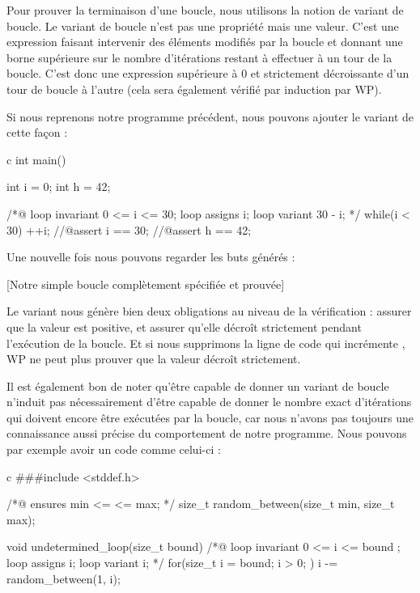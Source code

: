 \documentclass[middle]{zmdocument}
\begin{document}
Pour prouver la terminaison d'une boucle, nous utilisons la notion de variant de 
boucle. Le variant de boucle n'est pas une propriété mais une valeur. C'est une 
expression faisant intervenir des éléments modifiés par la boucle et donnant une
borne supérieure sur le nombre d'itérations restant à effectuer à un tour de la
boucle. C'est donc une expression supérieure à 0 et strictement décroissante d'un 
tour de boucle à l'autre (cela sera également vérifié par induction par WP).



Si nous reprenons notre programme précédent, nous pouvons ajouter le variant
de cette façon :



\begin{CodeBlock}{c}
int main(){
  int i = 0;
  int h = 42;
  
  /*@
    loop invariant 0 <= i <= 30;
    loop assigns i;
    loop variant 30 - i;
  */
  while(i < 30){
    ++i;
  }
  //@assert i == 30;
  //@assert h == 42;
}
\end{CodeBlock}



Une nouvelle fois nous pouvons regarder les buts générés :



[Notre simple boucle complètement spécifiée et prouvée]


Le variant nous génère bien deux obligations au niveau de la vérification : 
assurer que la valeur est positive, et assurer qu'elle décroît strictement pendant
l'exécution de la boucle. Et si nous supprimons la ligne de code qui incrémente
, WP ne peut plus prouver que la valeur  décroît strictement.



Il est également bon de noter qu'être capable de donner un variant de boucle
n'induit pas nécessairement d'être capable de donner le nombre exact d'itérations
qui doivent encore être exécutées par la boucle, car nous n'avons pas toujours une
connaissance aussi précise du comportement de notre programme. Nous pouvons par
 exemple avoir un code comme celui-ci :



\begin{CodeBlock}{c}
###include <stddef.h>

/*@
  ensures min <= \result <= max;
*/
size_t random_between(size_t min, size_t max);

void undetermined_loop(size_t bound){
  /*@
    loop invariant 0 <= i <= bound ;
    loop assigns i;
    loop variant i;
   */
  for(size_t i = bound; i > 0; ){
    i -= random_between(1, i);
  }
}
\end{CodeBlock}
\end{document}
